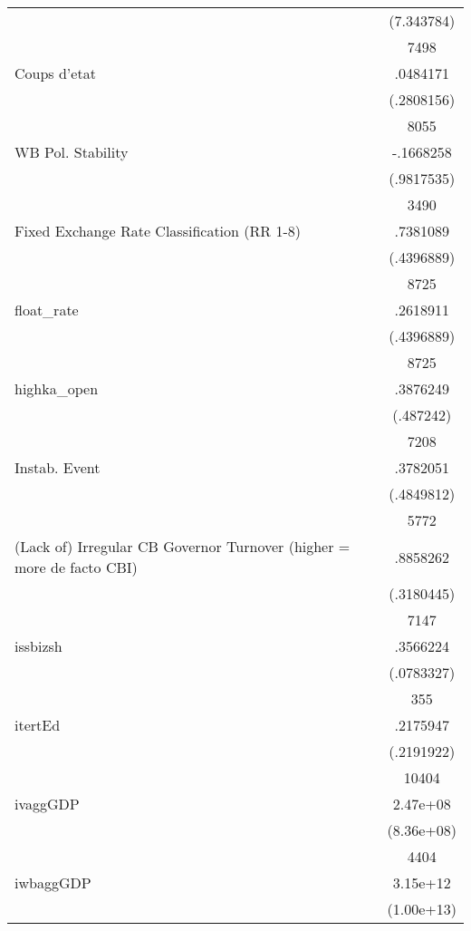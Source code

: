 {\begin{longtable}{l*{1}{c}}
                    &  (7.343784)\\
                    &        7498\\
Coups d'etat        &    .0484171\\
                    &  (.2808156)\\
                    &        8055\\
WB Pol. Stability   &   -.1668258\\
                    &  (.9817535)\\
                    &        3490\\
Fixed Exchange Rate Classification (RR 1-8)&    .7381089\\
                    &  (.4396889)\\
                    &        8725\\
float\_rate          &    .2618911\\
                    &  (.4396889)\\
                    &        8725\\
highka\_open         &    .3876249\\
                    &   (.487242)\\
                    &        7208\\
Instab. Event       &    .3782051\\
                    &  (.4849812)\\
                    &        5772\\
(Lack of) Irregular CB Governor Turnover (higher = more de facto CBI)&    .8858262\\
                    &  (.3180445)\\
                    &        7147\\
issbizsh            &    .3566224\\
                    &  (.0783327)\\
                    &         355\\
itertEd             &    .2175947\\
                    &  (.2191922)\\
                    &       10404\\
ivaggGDP            &    2.47e+08\\
                    &  (8.36e+08)\\
                    &        4404\\
iwbaggGDP           &    3.15e+12\\
                    &  (1.00e+13)\\

\end{longtable}}
